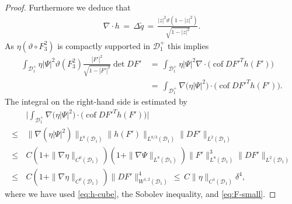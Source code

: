 \documentclass[reqno,makeidx,12pt]{amsart}
\theoremstyle{note}
\theoremstyle{definition}
\begin{document}
\begin{proof}
Furthermore we deduce that
\begin{gather*}
	\nabla\cdot h\,=\, \Delta \tilde{q} \,=\, \frac{|z|^2{\vartheta}(1-|z|^2)}{\sqrt{1-|z|^2}}.
\end{gather*}
As $\eta ({\vartheta}\circ F_3^2)$ is compactly supported in ${\mathcal{D}}_1^+$ this implies
\begin{align*}
	 \int_{{\mathcal{D}}_1^+}  \eta |\Psi|^2 {\vartheta}(F_3^2)\frac{|F'|^2}{\sqrt{1-|F'|^2}} \det DF' \,&=\,  \int_{{\mathcal{D}}_1^+}  \eta|\Psi|^2 \nabla\cdot  \Big(\operatorname{cof} DF'^T h(F')\Big)\\
	 &=\, \int_{{\mathcal{D}}_1^+}  \nabla\big(\eta|\Psi|^2\big)\cdot \Big(\operatorname{cof} DF'^T h(F')\Big).
\end{align*}
The integral on the right-hand side is estimated by
\begin{align*}
	&\Big|\int_{{\mathcal{D}}_1^+}  \nabla\big(\eta|\Psi|^2\big)\cdot \Big(\operatorname{cof} DF'^T h(F')\Big) \Big| \\
	\leq\,& \|\nabla (\eta|\Psi|^2)\|_{L^8({\mathcal{D}}_1)}\|h(F')\|_{L^{8/3}({\mathcal{D}}_1)}\|DF'\|_{L^2({\mathcal{D}}_1)}\\
	\leq\, &C(1+\|\nabla\eta\|_{C^0({\mathcal{D}}_1)})(1+\|\nabla\Psi\|_{L^8({\mathcal{D}}_1)})\|F'\|_{L^{8}({\mathcal{D}}_1)}^3\|DF'\|_{L^2({\mathcal{D}}_1)}\\
	\leq\, &C(1+\|\nabla\eta\|_{C^0({\mathcal{D}}_1)})\|DF'\|_{W^{1,2}({\mathcal{D}}_1)}^4\,\leq\, C\|\eta\|_{C^1({\mathcal{D}}_1)}\delta^4,
\end{align*}
where we have used \eqref{eq:h-cube}, the Sobolev inequality, and \eqref{eq:F-small}.
\end{proof}
\end{document}

